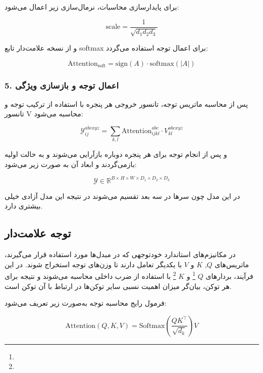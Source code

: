 برای پایدارسازی محاسبات، نرمال‌سازی زیر اعمال می‌شود:

\begin{equation}
	\text{scale} = \frac{1}{\sqrt{d_1 d_2 d_3}}
\end{equation}

و از نسخه علامت‌دار تابع softmax برای اعمال توجه استفاده می‌گردد:

\begin{equation}
	\text{Attention}_{\text{soft}} = \text{sign}(A) \cdot \text{softmax}(|A|)
\end{equation}

\subsubsection*{5. اعمال توجه و بازسازی ویژگی}

پس از محاسبه ماتریس توجه، تانسور خروجی هر پنجره با استفاده از ترکیب توجه و تانسور V محاسبه می‌شود:

\begin{equation}
	\mathcal{Y}_{ij}^{abcxyz} = \sum_{k,l} \text{Attention}_{ijkl}^{abc} \cdot V_{kl}^{abcxyz}
\end{equation}

و پس از انجام توجه برای هر پنجره دوباره بازآرایی می‌شوند و به حالت اولیه بازمی‌گردند و ابعاد آن به صورت زیر می‌شود:

\[
\mathcal{Y} \in \mathbb{R}^{B \times H \times W \times D_1 \times D_2 \times D_3}
\]

در این مدل چون سرها در سه بعد تقسیم می‌شوند در نتیجه این مدل آزادی خیلی بیشتری دارد.

\subsection{توجه علامت‌دار}

در مکانیزم‌های استاندارد خودتوجهی که در مبدل‌ها مورد استفاده قرار می‌گیرند، ماتریس‌های $Q$, $K$ و $V$ با یکدیگر تعامل دارند تا وزن‌های توجه استخراج شوند. در این فرآیند، بردارهای $Q$ \footnote{}
و $K$
\footnote{}
با استفاده از ضرب داخلی محاسبه می‌شوند و نتیجه برای هر توکن، بیان‌گر میزان اهمیت نسبی سایر توکن‌ها در ارتباط با آن توکن است.

فرمول رایج محاسبه توجه به‌صورت زیر تعریف می‌شود:

\begin{equation}
	\text{Attention}(Q, K, V) = \text{Softmax}\left( \frac{QK^\top}{\sqrt{d_k}} \right) V
\end{equation}

